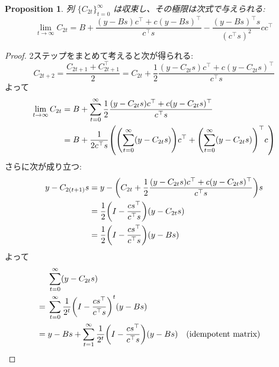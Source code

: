 \documentclass[a4paper, 10pt, dvipdfmx,draft]{article}
\newtheorem{proposition}{Proposition}
\begin{document}
\begin{proposition}
    列 $\{ C_{2t} \}_{t=0}^{\infty}$ は収束し、その極限は次式で与えられる:
    \begin{equation*}
        \lim_{t \to \infty} C_{2t}
        = B + \frac{(y - Bs)c^\top + c(y - Bs)^\top}{c^\top s} - \frac{(y - Bs)^\top s}{(c^\top s)^2} c c^\top
    \end{equation*}
\end{proposition}
\begin{proof}
    2ステップをまとめて考えると次が得られる:
    \begin{equation*}
        C_{2t+2} = \frac{C_{2t+1} + C_{2t+1}^\top}{2}
        = C_{2t}
        + \frac{1}{2}
        \frac{(y - C_{2t}s)c^\top + c(y - C_{2t}s)^\top}{c^\top s}
    \end{equation*}
    よって
    \begin{align*}
        \lim_{t \to \infty} C_{2t}
         & = B + \sum_{t=0}^{\infty} \frac{1}{2} \frac{(y - C_{2t}s)c^\top + c(y - C_{2t}s)^\top}{c^\top s}                                 \\
         & = B + \frac{1}{2 c^\top s} \qty(\qty(\sum_{t=0}^{\infty} (y - C_{2t}s)) c^\top + \qty(\sum_{t=0}^{\infty} (y - C_{2t}s))^\top c)
    \end{align*}
    さらに次が成り立つ:
    \begin{align*}
        y - C_{2(t+1)}s
         & = y - \qty(C_{2t}
        + \frac{1}{2}
        \frac{(y - C_{2t}s)c^\top + c(y - C_{2t}s)^\top}{c^\top s})s   \\
         & = \frac{1}{2}
        \qty(I - \frac{c s^\top}{c^\top s})
        (y - C_{2t}s)                                                  \\
         & = \frac{1}{2} \qty(I - \frac{c s^\top}{c^\top s}) (y - B s)
    \end{align*}
    よって
    \begin{align*}
                                                                                        & \sum_{t=0}^{\infty} (y - C_{2t}s)                                                                              \\
        = {}                                                                            & \sum_{t=0}^{\infty} \frac{1}{2^t} \qty(I - \frac{c s^\top}{c^\top s})^t (y - B s)                              \\
        = {}                                                                            &
        y - B s+
        \sum_{t=1}^{\infty} \frac{1}{2^t} \qty(I - \frac{c s^\top}{c^\top s}) (y - B s) &                                                                                   & (\text{idempotent matrix}) \\

\end{align*}
\end{proof}
\end{document}
